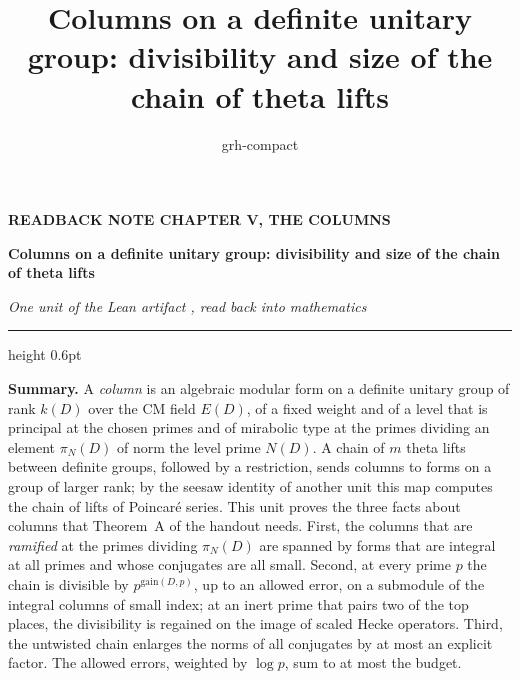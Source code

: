 \documentclass[11pt,a4paper]{article}
\title{Columns on a definite unitary group: divisibility and size of the chain of theta lifts}
\author{grh-compact}
\date{}
\theoremstyle{plainx}
\theoremstyle{uprightx}
\newcommand{\ED}[1]{E(#1)}
\newcommand{\kD}[1]{k(#1)}
\newcommand{\ND}[1]{N(#1)}
\newcommand{\piN}[1]{\pi_N(#1)}
\newcommand{\gain}[2]{\mathrm{gain}(#1,#2)}
\begin{document}
\color{ink}

{\raggedright
{\sffamily\bfseries\fontsize{7.2}{9}\selectfont\color{leancol}READBACK NOTE \textperiodcentered{} CHAPTER V, THE COLUMNS\par}
\vspace{5pt}
{\fontsize{21.5}{25.5}\selectfont\bfseries Columns on a definite unitary group: divisibility and size of the chain of theta lifts\par}
\vspace{5pt}
{\fontsize{12.4}{16}\selectfont\itshape\color{inksoft} One unit of the Lean artifact \ArtifactName, read back into
mathematics\par}}
\vspace{8pt}
{\color{rulegrey}\hrule height 0.6pt}
\vspace{7pt}
\thispagestyle{empty}

\textbf{Summary.} A \emph{column} is an algebraic modular form on a definite unitary group of rank $\kD{D}$ over the
CM field $\ED{D}$, of a fixed weight and of a level that is principal at the chosen primes and of mirabolic type at
the primes dividing an element $\piN{D}$ of norm the level prime $\ND{D}$. A chain of $m$ theta lifts between
definite groups, followed by a restriction, sends columns to forms on a group of larger rank; by the seesaw
identity of another unit this map computes the chain of lifts of Poincar\'e series. This unit proves the three
facts about columns that Theorem~A of the handout needs. First, the columns that are \emph{ramified} at the
primes dividing $\piN{D}$ are spanned by forms that are integral at all primes and whose conjugates are all small.
Second, at every prime $p$ the chain is divisible by $p^{\gain{D}{p}}$, up to an allowed error, on a submodule of
the integral columns of small index; at an inert prime that pairs two of the top places, the divisibility is
regained on the image of scaled Hecke operators. Third, the untwisted chain enlarges the norms of all conjugates
by at most an explicit factor. The allowed errors, weighted by $\log p$, sum to at most the budget.
\end{document}
